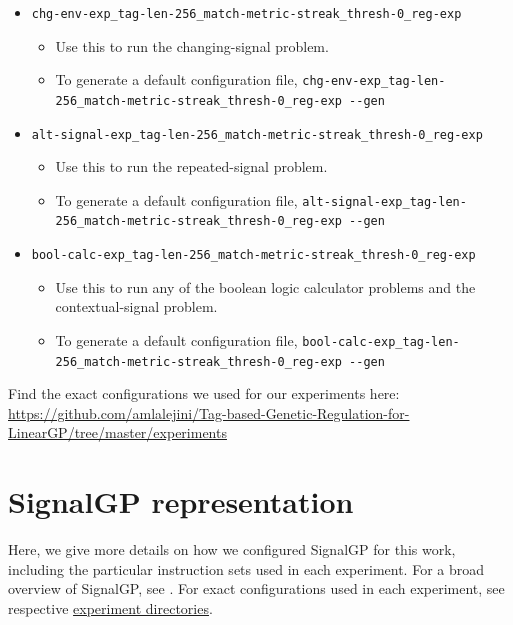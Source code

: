 \documentclass[
]{book}
\providecommand{\tightlist}{%
  \setlength{\itemsep}{0pt}\setlength{\parskip}{0pt}}
\begin{document}
\begin{itemize}
\tightlist
\item
  \texttt{chg-env-exp\_tag-len-256\_match-metric-streak\_thresh-0\_reg-exp}

  \begin{itemize}
  \tightlist
  \item
    Use this to run the changing-signal problem.
  \item
    To generate a default configuration file, \texttt{chg-env-exp\_tag-len-256\_match-metric-streak\_thresh-0\_reg-exp\ -\/-gen}
  \end{itemize}
\item
  \texttt{alt-signal-exp\_tag-len-256\_match-metric-streak\_thresh-0\_reg-exp}

  \begin{itemize}
  \tightlist
  \item
    Use this to run the repeated-signal problem.
  \item
    To generate a default configuration file, \texttt{alt-signal-exp\_tag-len-256\_match-metric-streak\_thresh-0\_reg-exp\ -\/-gen}
  \end{itemize}
\item
  \texttt{bool-calc-exp\_tag-len-256\_match-metric-streak\_thresh-0\_reg-exp}

  \begin{itemize}
  \tightlist
  \item
    Use this to run any of the boolean logic calculator problems and the contextual-signal problem.
  \item
    To generate a default configuration file, \texttt{bool-calc-exp\_tag-len-256\_match-metric-streak\_thresh-0\_reg-exp\ -\/-gen}
  \end{itemize}
\end{itemize}

Find the exact configurations we used for our experiments here: \url{https://github.com/amlalejini/Tag-based-Genetic-Regulation-for-LinearGP/tree/master/experiments}

\hypertarget{signalgp-representation}{%
\chapter{SignalGP representation}\label{signalgp-representation}}

Here, we give more details on how we configured SignalGP for this work, including the particular instruction sets used in each experiment.
For a broad overview of SignalGP, see \citep{lalejini_evolving_2018}.
For exact configurations used in each experiment, see respective \href{https://github.com/amlalejini/Tag-based-Genetic-Regulation-for-LinearGP/tree/master/experiments}{experiment directories}.
\end{document}

